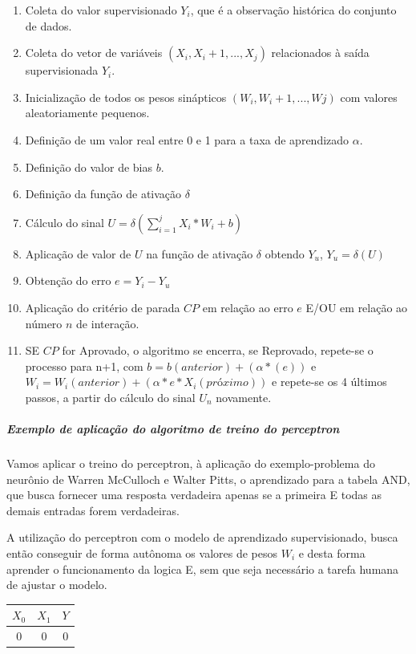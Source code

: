 \documentclass[	12pt, Times, openright, twoside, a4paper, english, brazil]{abntex2}
\begin{document}
            \begin{enumerate}
              \item Coleta do valor supervisionado $Y_i$, que é a observação histórica do conjunto de dados.
              \item Coleta do vetor de variáveis $(X_i, X_i+1, ..., X_j)$ relacionados à saída supervisionada $Y_i$.
              \item Inicialização de todos os pesos sinápticos $(W_i, W_i+1, ..., Wj)$ com valores aleatoriamente pequenos.
              \item Definição de um valor real entre 0 e 1 para a taxa de aprendizado $\alpha$.
              \item Definição do valor de bias $b$.
              \item Definição da função de ativação $\delta$ 
              \item Cálculo do sinal $U = \delta(\sum_{i=1}^{j}X_i*W_i+b)$
              \item Aplicação de valor de $U$ na função de ativação $\delta$ obtendo $Y_u$, $Y_u = \delta(U)$
              \item Obtenção do erro $e = Y_i-Y_u$
              \item Aplicação do critério de parada $CP$ em relação ao erro $e$ E/OU em relação ao número $n$ de interação.
              \item SE $CP$ for Aprovado, o algoritmo se encerra, se Reprovado, repete-se o processo para n+1, com $b=b(anterior)+(\alpha*(e))$ e $W_i = W_i(anterior)+(\alpha*e*X_i(próximo))$ e repete-se os 4 últimos passos, a partir do cálculo do sinal $U_n$ novamente. 
            \end{enumerate}
            
            \subparagraph* {Exemplo de aplicação do algoritmo de treino do perceptron}
            	Vamos aplicar o treino do perceptron, à aplicação do exemplo-problema do neurônio de Warren McCulloch e Walter Pitts, o aprendizado para a tabela AND, que busca fornecer uma resposta verdadeira apenas se a primeira E todas as demais entradas forem verdadeiras.
            	
            	 A utilização do perceptron com o modelo de aprendizado supervisionado, busca então conseguir de forma autônoma os valores de pesos $W_i$ e desta forma aprender o funcionamento da logica E, sem que seja necessário a tarefa humana de ajustar o modelo.
  				 
  				  \begin{tabular}{|c|c|c|}
  				 	\hline  \textbf{$X_0$} & \textbf{$X_1$} &  \textbf{$Y$}\\
  				 	\hline 0 & 0 & 0\\
  				  \end{tabular}
  			 
\end{document}
